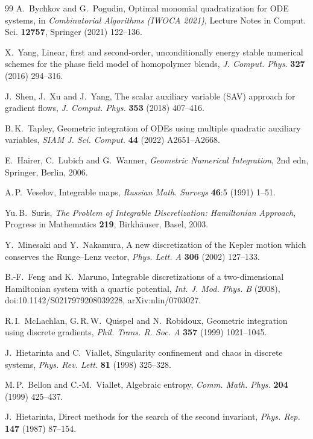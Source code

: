 \documentclass[11pt,a4paper]{article}
\theoremstyle{definition}
\theoremstyle{remark}
\begin{document}
\begin{thebibliography}{99}
 A.~Bychkov and G.~Pogudin, Optimal monomial quadratization for ODE systems, in
\emph{Combinatorial Algorithms (IWOCA 2021)}, Lecture Notes in Comput. Sci. \textbf{12757}, Springer (2021)
122--136.

 X.~Yang, Linear, first and second-order, unconditionally energy stable numerical schemes for
the phase field model of homopolymer blends, \emph{J. Comput. Phys.} \textbf{327} (2016) 294--316.

 J.~Shen, J.~Xu and J.~Yang, The scalar auxiliary variable (SAV) approach for gradient
flows, \emph{J. Comput. Phys.} \textbf{353} (2018) 407--416.

 B.\,K.~Tapley, Geometric integration of ODEs using multiple quadratic auxiliary variables,
\emph{SIAM J. Sci. Comput.} \textbf{44} (2022) A2651--A2668.

 E.~Hairer, C.~Lubich and G.~Wanner, \emph{Geometric Numerical Integration}, 2nd edn, Springer,
Berlin, 2006.

 A.\,P.~Veselov, Integrable maps, \emph{Russian Math. Surveys} \textbf{46}:5 (1991) 1--51.

 Yu.\,B.~Suris, \emph{The Problem of Integrable Discretization: Hamiltonian Approach},
Progress in Mathematics \textbf{219}, Birkh\"auser, Basel, 2003.

 Y.~Minesaki and Y.~Nakamura, A new discretization of the Kepler motion which
conserves the Runge--Lenz vector, \emph{Phys. Lett. A} \textbf{306} (2002) 127--133.

 B.-F.~Feng and K.~Maruno, Integrable discretizations of a two-dimensional Hamiltonian
system with a quartic potential, \emph{Int. J. Mod. Phys. B} (2008), doi:10.1142/S0217979208039228,
arXiv:nlin/0703027.

 R.\,I.~McLachlan, G.\,R.\,W.~Quispel and N.~Robidoux, Geometric integration using discrete
gradients, \emph{Phil. Trans. R. Soc. A} \textbf{357} (1999) 1021--1045.

 J.~Hietarinta and C.~Viallet, Singularity confinement and chaos in discrete
systems, \emph{Phys. Rev. Lett.} \textbf{81} (1998) 325--328.

 M.\,P.~Bellon and C.-M.~Viallet, Algebraic entropy, \emph{Comm. Math. Phys.}
\textbf{204} (1999) 425--437.

 J.~Hietarinta, Direct methods for the search of the second invariant, \emph{Phys. Rep.}
\textbf{147} (1987) 87--154.


\end{thebibliography}
\end{document}
